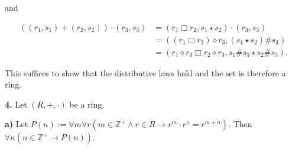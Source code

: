 \documentclass[12pt, a4paper]{article}
\begin{document}
\par and

\begin{equation*}
    \begin{split}
        ((r_1,s_1)+(r_2,s_2))\cdot(r_3,s_3) & = (r_1\Box r_2, s_1\star s_2)\cdot(r_3,s_3) \\
        & = ((r_1\Box r_2)\diamond r_3, (s_1\star s_2)\# s_3) \\
        & = (r_1\diamond r_3\Box r_2\diamond r_3, s_1\# s_3\star s_2\# s_3).
    \end{split}
\end{equation*}

\par This suffices to show that the distributive laws hold and the set is therefore a ring.

\vspace{4mm}

\noindent\textbf{4.} Let $(R,+,\cdot)$ be a ring.

\vspace{4mm}

\par\textbf{a)} Let $P(n):=\forall m\forall r(m\in\mathbb{Z}^+\wedge r\in R\rightarrow r^m\cdot r^n=r^{m+n})$. Then $\forall n(n\in\mathbb{Z}^+\rightarrow P(n))$.
\end{document}
